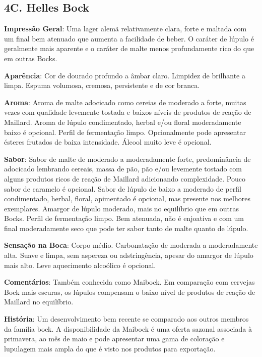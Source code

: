 \subsection*{4C. Helles Bock}

\textbf{Impressão Geral}: Uma lager alemã relativamente clara, forte e maltada com um final bem atenuado que aumenta a facilidade de beber. O caráter de lúpulo é geralmente mais aparente e o caráter de malte menos profundamente rico do que em outras Bocks.

\textbf{Aparência}: Cor de dourado profundo a âmbar claro. Limpidez de brilhante a limpa. Espuma volumosa, cremosa, persistente e de cor branca.

\textbf{Aroma}: Aroma de malte adocicado como cereias de moderado a forte, muitas vezes com qualidade levemente tostada e baixos níveis de produtos de reação de Maillard. Aroma de lúpulo condimentado, herbal e/ou floral moderadamente baixo é opcional. Perfil de fermentação limpo. Opcionalmente pode apresentar ésteres frutados de baixa intensidade. Álcool muito leve é opcional.

\textbf{Sabor}: Sabor de malte de moderado a moderadamente forte, predominância de adocicado lembrando cereais, massa de pão, pão e/ou levemente tostado com alguns produtos ricos de reação de Maillard adicionando complexidade. Pouco sabor de caramelo é opcional. Sabor de lúpulo de baixo a moderado de perfil condimentado, herbal, floral, apimentado é opcional, mas presente nos melhores exemplares. Amargor de lúpulo moderado, mais no equilíbrio que em outras Bocks. Perfil de fermentação limpo. Bem atenuada, não é enjoativa e com um final moderadamente seco que pode ter sabor tanto de malte quanto de lúpulo.

\textbf{Sensação na Boca}: Corpo médio. Carbonatação de moderada a moderadamente alta. Suave e limpa, sem aspereza ou adstringência, apesar do amargor de lúpulo mais alto. Leve aquecimento alcoólico é opcional.

\textbf{Comentários}: Também conhecida como Maibock. Em comparação com cervejas Bock mais escuras, os lúpulos compensam o baixo nível de produtos de reação de Maillard no equilíbrio.

\textbf{História}: Um desenvolvimento bem recente se comparado aos outros membros da família bock. A disponibilidade da Maibock é uma oferta sazonal associada à primavera, ao mês de maio e pode apresentar uma gama de coloração e lupulagem mais ampla do que é visto nos produtos para exportação.

